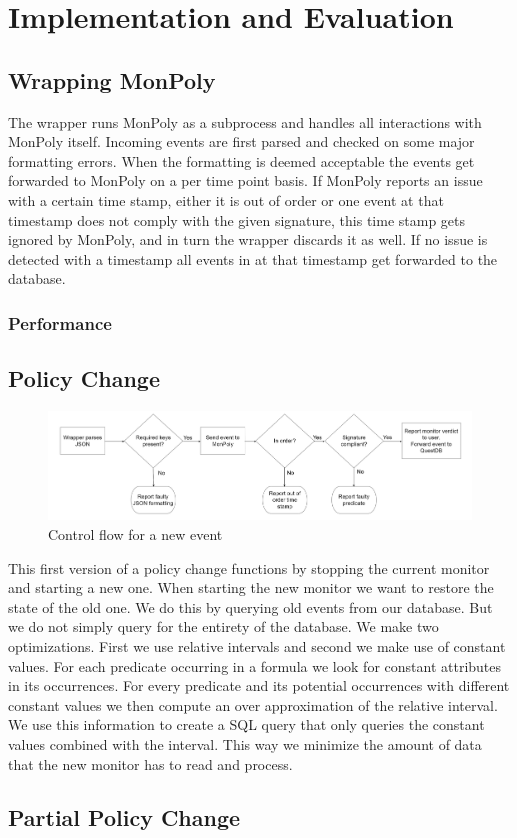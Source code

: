 \chapter{Implementation and Evaluation}

\section{Wrapping MonPoly}



The wrapper runs MonPoly as a subprocess and handles all interactions with MonPoly itself.
Incoming events are first parsed and checked on some major formatting errors.
When the formatting is deemed acceptable the events get forwarded to MonPoly on a per time point basis.
If MonPoly reports an issue with a certain time stamp, either it is out of order or one event at that timestamp does not comply with the given signature, this time stamp gets ignored by MonPoly, and in turn the wrapper discards it as well.
If no issue is detected with a timestamp all events in at that timestamp get forwarded to the database.

\subsection{Performance}


\section{Policy Change}
% 

\begin{figure}
    \label{fig:flowchart}
    \centering
    \includegraphics[width=\linewidth]{diagrams/flowchart-2.png}
    \caption{Control flow for a new event}
\end{figure}

This first version of a policy change functions by stopping the current monitor and starting a new one.
When starting the new monitor we want to restore the state of the old one.
We do this by querying old events from our database.
But we do not simply query for the entirety of the database.
We make two optimizations.
First we use relative intervals and second we make use of constant values.
For each predicate occurring in a formula we look for constant attributes in its occurrences.
For every predicate and its potential occurrences with different constant values we then compute an over approximation of the relative interval.
We use this information to create a SQL query that only queries the constant values combined with the interval.
This way we minimize the amount of data that the new monitor has to read and process.


\section{Partial Policy Change}

